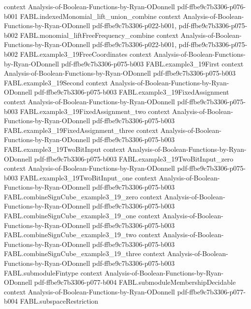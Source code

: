 \begin{theorem}
  {context}
  {Analysis-of-Boolean-Functions-by-Ryan-ODonnell}
  {pdf-ffbe9c7b3306-p076-b001}
\proofstep
  {FABL.indexedMonomial_lift_union_combine}
  {context}
  {Analysis-of-Boolean-Functions-by-Ryan-ODonnell}
  {pdf-ffbe9c7b3306-p022-b001,
    pdf-ffbe9c7b3306-p075-b002}
\proofstep
  {FABL.monomial_liftFreeFrequency_combine}
  {context}
  {Analysis-of-Boolean-Functions-by-Ryan-ODonnell}
  {pdf-ffbe9c7b3306-p022-b001,
    pdf-ffbe9c7b3306-p075-b002}
\proofstep
  {FABL.example3_19FreeCoordinates}
  {context}
  {Analysis-of-Boolean-Functions-by-Ryan-ODonnell}
  {pdf-ffbe9c7b3306-p075-b003}
\proofstep
  {FABL.example3_19First}
  {context}
  {Analysis-of-Boolean-Functions-by-Ryan-ODonnell}
  {pdf-ffbe9c7b3306-p075-b003}
\proofstep
  {FABL.example3_19Second}
  {context}
  {Analysis-of-Boolean-Functions-by-Ryan-ODonnell}
  {pdf-ffbe9c7b3306-p075-b003}
\proofstep
  {FABL.example3_19FixedAssignment}
  {context}
  {Analysis-of-Boolean-Functions-by-Ryan-ODonnell}
  {pdf-ffbe9c7b3306-p075-b003}
\proofstep
  {FABL.example3_19FixedAssignment_two}
  {context}
  {Analysis-of-Boolean-Functions-by-Ryan-ODonnell}
  {pdf-ffbe9c7b3306-p075-b003}
\proofstep
  {FABL.example3_19FixedAssignment_three}
  {context}
  {Analysis-of-Boolean-Functions-by-Ryan-ODonnell}
  {pdf-ffbe9c7b3306-p075-b003}
\proofstep
  {FABL.example3_19TwoBitInput}
  {context}
  {Analysis-of-Boolean-Functions-by-Ryan-ODonnell}
  {pdf-ffbe9c7b3306-p075-b003}
\proofstep
  {FABL.example3_19TwoBitInput_zero}
  {context}
  {Analysis-of-Boolean-Functions-by-Ryan-ODonnell}
  {pdf-ffbe9c7b3306-p075-b003}
\proofstep
  {FABL.example3_19TwoBitInput_one}
  {context}
  {Analysis-of-Boolean-Functions-by-Ryan-ODonnell}
  {pdf-ffbe9c7b3306-p075-b003}
\proofstep
  {FABL.combineSignCube_example3_19_zero}
  {context}
  {Analysis-of-Boolean-Functions-by-Ryan-ODonnell}
  {pdf-ffbe9c7b3306-p075-b003}
\proofstep
  {FABL.combineSignCube_example3_19_one}
  {context}
  {Analysis-of-Boolean-Functions-by-Ryan-ODonnell}
  {pdf-ffbe9c7b3306-p075-b003}
\proofstep
  {FABL.combineSignCube_example3_19_two}
  {context}
  {Analysis-of-Boolean-Functions-by-Ryan-ODonnell}
  {pdf-ffbe9c7b3306-p075-b003}
\proofstep
  {FABL.combineSignCube_example3_19_three}
  {context}
  {Analysis-of-Boolean-Functions-by-Ryan-ODonnell}
  {pdf-ffbe9c7b3306-p075-b003}
\proofstep
  {FABL.submoduleFintype}
  {context}
  {Analysis-of-Boolean-Functions-by-Ryan-ODonnell}
  {pdf-ffbe9c7b3306-p077-b004}
\proofstep
  {FABL.submoduleMembershipDecidable}
  {context}
  {Analysis-of-Boolean-Functions-by-Ryan-ODonnell}
  {pdf-ffbe9c7b3306-p077-b004}
\proofstep
  {FABL.subspaceRestriction}

\end{theorem}
